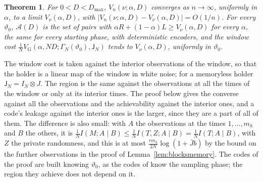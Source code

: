 \documentclass[11pt,onecolumn]{IEEEtran}
\newtheorem{theorem}{Theorem}
\newcommand{\VG}{V_{\mathrm G}}
\begin{document}
\begin{theorem}\label{thm:ergodic}
For $0<D<D_{\max}$, $V_n(\nu;\alpha,D)$ converges as $n\to\infty$, uniformly
in $\alpha$, to a limit $V_\nu(\alpha,D)$, with
$|V_n(\nu;\alpha,D)-V_\nu(\alpha,D)|=O(1/n)$. For every $\vartheta_0$, $\mathcal A(D)$
is the set of pairs with $\alpha R+(1-\alpha)L\ge V_\nu(\alpha,D)$ for every
$\alpha$, the same for every starting phase, with deterministic
encoders, and the window cost
$\tfrac1N\VG(\alpha,ND;\Gamma_N(\vartheta_0),\mathsf J_N)$ tends to
$V_\nu(\alpha,D)$, uniformly in $\vartheta_0$.
\end{theorem}

The window cost is taken against the interior observations of the
window, so that the holder is a linear map of the window in white
noise; for a memoryless holder $\mathsf J_N=I_N\otimes J$. The region is the
same against the observations at all the times of the window or only
at its interior times. The proof below gives the converse against all
the observations and the achievability against the interior ones, and
a code's leakage against the interior ones is the larger, since they
are a part of all of them. The difference is also small: with $A$ the
observations at the times $1,\dots,m_h$ and $B$ the others, it is
$\tfrac1NI(M;A\mid B)\le\tfrac1NI(T,Z;A\mid B)=\tfrac1NI(T;A\mid B)$, with $Z$ the
private randomness, and this is at most $\tfrac{rm_h}{2N}\log(1+\bar Jb)$
by the bound on the further observations in the proof of
Lemma~\ref{lem:blocksmemory}. The codes of
the proof are built knowing $\vartheta_0$, as the codes of \cite{tan2024}
know the sampling phase; the region they achieve does not depend on
it.
\end{document}
